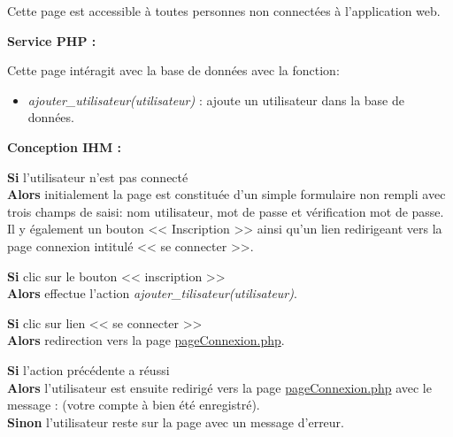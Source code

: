			\begin{paragraphe}
				Cette page est accessible à toutes personnes non connectées à l'application web.
			\end{paragraphe}

			\begin{paragraphe}
				\textbf{Service PHP :}
			\end{paragraphe}

			\begin{paragraphe}
			    Cette page intéragit avec la base de données avec la fonction:
				\begin{itemize}
					\item \emph{ajouter\_utilisateur(utilisateur)} : ajoute un utilisateur dans la base de données.
				\end{itemize}
			\end{paragraphe}

			\begin{paragraphe}
				\textbf{Conception IHM :}
			\end{paragraphe}

			\begin{paragraphe}
				\textbf{Si} l'utilisateur n'est pas connecté \\
				\textbf{Alors} initialement la page est constituée d'un simple formulaire non rempli avec trois champs de saisi: nom utilisateur, mot de passe et vérification mot de passe.
				Il y également un bouton << Inscription >> ainsi qu'un lien redirigeant vers la page connexion intitulé << se connecter >>.
			\end{paragraphe}

			\begin{paragraphe}
				\textbf{Si} clic sur le bouton << inscription >> \\
				\textbf{Alors} effectue l'action \emph{ajouter\_tilisateur(utilisateur)}.
			\end{paragraphe}

           \begin{paragraphe}
                \textbf{Si} clic sur lien << se connecter >> \\
                \textbf{Alors} redirection vers la page \underline{pageConnexion.php}.
            \end{paragraphe}

			\begin{paragraphe}
				\textbf{Si} l'action précédente a réussi \\
				\textbf{Alors} l'utilisateur est ensuite redirigé vers la page \underline{pageConnexion.php} avec le message : (votre compte à bien été enregistré). \\
				\textbf{Sinon} l'utilisateur reste sur la page avec un message d'erreur.
			\end{paragraphe}

